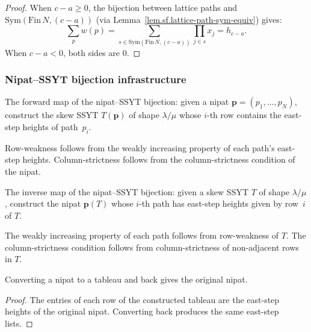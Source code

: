 \begin{proof}
When $c - a \geq 0$, the bijection between lattice paths and
$\mathrm{Sym}(\mathrm{Fin}\,N, (c-a))$ (via
Lemma~\ref{lem.sf.lattice-path-sym-equiv}) gives:
\[
\sum_p w(p) = \sum_{s \in \mathrm{Sym}(\mathrm{Fin}\,N, (c-a))}
\prod_{j \in s} x_j = h_{c-a}.
\]
When $c - a < 0$, both sides are $0$.
\end{proof}

\subsubsection{Nipat--SSYT bijection infrastructure}

\begin{definition}
\label{def.sf.nipat-to-ssyt}
\leanhelper
\leanok
The forward map of the nipat--SSYT bijection: given a nipat
$\mathbf{p} = (p_1, \ldots, p_N)$, construct the skew SSYT $T(\mathbf{p})$
of shape $\lambda/\mu$ whose $i$-th row contains the east-step heights
of path~$p_i$.

Row-weakness follows from the weakly increasing property of each path's
east-step heights. Column-strictness follows from the
column-strictness condition of the nipat.
\end{definition}

\begin{definition}
\label{def.sf.ssyt-to-nipat}
\leanhelper
\leanok
The inverse map of the nipat--SSYT bijection: given a skew SSYT $T$
of shape $\lambda/\mu$, construct the nipat $\mathbf{p}(T)$
whose $i$-th path has east-step heights given by row~$i$ of $T$.

The weakly increasing property of each path follows from row-weakness
of $T$. The column-strictness condition follows from
column-strictness of non-adjacent rows in $T$.
\end{definition}

\begin{lemma}
\label{lem.sf.ssyt-nipat-roundtrip-1}
\leanhelper
\leanok
Converting a nipat to a tableau and back gives the original nipat.
\end{lemma}

\begin{proof}
\leanok
The entries of each row of the constructed tableau are
the east-step heights of the original nipat. Converting back
produces the same east-step lists.
\end{proof}

